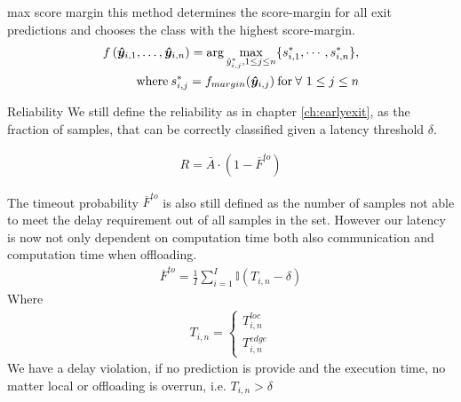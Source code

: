 \begin{enumdescript}
\begin{enumdescript}
			
			\item[max score margin] this method determines the score-margin for all exit predictions and chooses the class with the highest score-margin. 
			\begin{align}
			\begin{split}
			f\left(\bm{\hat{y}}_{i,1}, \dots, \bm{\hat{y}}_{i,n} \right) = \arg \underset{\hat{y}_{i,j}^{*}, 1 \le j 
				\le n}{\max} \{s^{*}_{i,1}, \cdots, s^{*}_{i,n}\},\\ \text{where\:} s^{*}_{i,j} = f_{margin}(\bm{\hat{y}}_{i,j}) \text{\:for\:} \forall \ 1 \le j \le n
			\end{split}	
			\end{align}
		\end{enumdescript}
	
		\item[Reliability]  We still define the reliability as in chapter \ref{ch:earlyexit}, as the fraction of samples, that can be correctly classified given a latency threshold $ \delta $.
		
		\begin{align}
		R= \bar{A} \cdot (1-\overline{F}^{to})
		\end{align}
		
		The timeout probability $ \overline{F}^{to} $ is also still defined as the number of samples not able to meet the delay requirement out of all samples in the set. However our latency is now not only dependent on computation time both also communication and computation time when offloading.
		\begin{align}
		\overline{F}^{to}=\frac{1}{I}\sum_{i=1}^{I} \mathbb{I}\left(T_{i,n}-\delta\right)
		\end{align}
		Where
		\begin{align}
			T_{i,n} = \begin{cases}
				T_{i,n}^{loc} \\
				T_{i,n}^{edge}
			\end{cases}
		\end{align}
		We have a delay violation, if no prediction is provide and the execution time, no matter local or offloading is overrun, i.e. $ T_{i,n} > \delta $  
	

\end{enumdescript}
